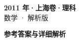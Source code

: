 \documentclass[zihao=-4, a4paper]{ctexart}
\begin{document}
\begin{center}
  {\Large\bfseries 2011 年·上海卷·理科}\\[4pt]
  {\large 数学 · 解析版}
\end{center}
\medskip
{}

\clearpage
{}
\begin{center}{\Large\bfseries 参考答案与详细解析}\end{center}
\medskip

\end{document}
